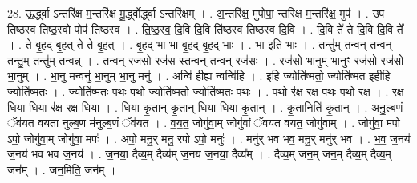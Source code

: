 \documentclass[17pt]{extarticle}
\begin{document}
28. ऊ॒र्द्ध्वा ऽन्तरि॑क्ष म॒न्तरि॑क्ष मू॒र्द्ध्वोर्द्ध्वा ऽन्तरि॑क्षम् । . अ॒न्तरि॑क्ष॒ मुपोपा॒ न्तरि॑क्ष म॒न्तरि॑क्ष॒ मुप॑ । . उप॑ तिष्ठस्व तिष्ठ॒स्वो पोप॑ तिष्ठस्व । . ति॒ष्ठ॒स्व॒ दि॒वि दि॒वि ति॑ष्ठस्व तिष्ठस्व दि॒वि । . दि॒वि ते॑ ते दि॒वि दि॒वि ते᳚ । . ते॒ बृ॒हद् बृ॒हत् ते॑ ते बृ॒हत् । . बृ॒हद् भा भा बृ॒हद् बृ॒हद् भाः । . भा इति॒ भाः । . तन्तु॑म् त॒न्वन् त॒न्वन् तन्तु॒म् तन्तु॑म् त॒न्वन्न् । . त॒न्वन् रज॑सो॒ रज॑स स्त॒न्वन् त॒न्वन् रज॑सः । . रज॑सो भा॒नुम् भा॒नुꣳ रज॑सो॒ रज॑सो भा॒नुम् । . भा॒नु मन्वनु॑ भा॒नुम् भा॒नु मनु॑ । . अन्वि॑ ही॒ह्य न्वन्वि॑हि । . इ॒हि॒ ज्योति॑ष्मतो॒ ज्योति॑ष्मत इहीहि॒ ज्योति॑ष्मतः । . ज्योति॑ष्मतः प॒थः प॒थो ज्योति॑ष्मतो॒ ज्योति॑ष्मतः प॒थः । . प॒थो र॑क्ष रक्ष प॒थः प॒थो र॑क्ष । . र॒क्ष॒ धि॒या धि॒या र॑क्ष रक्ष धि॒या । . धि॒या कृ॒तान् कृ॒तान् धि॒या धि॒या कृ॒तान् । . कृ॒तानिति॑ कृ॒तान् । . अ॒नु॒ल्ब॒णं ॅव॑यत वयता नुल्ब॒ण म॑नुल्ब॒णं ॅव॑यत । . व॒य॒त॒ जोगु॑वा॒म् जोगु॑वां ॅवयत वयत॒ जोगु॑वाम् । . जोगु॑वा॒ मपो ऽपो॒ जोगु॑वा॒म् जोगु॑वा॒ मपः॑ । . अपो॒ मनु॒र् मनु॒ रपो ऽपो॒ मनुः॑ । . मनु॑र् भव भव॒ मनु॒र् मनु॑र् भव । . भ॒व॒ ज॒नय॑ ज॒नय॑ भव भव ज॒नय॑ । . ज॒नया॒ दैव्य॒म् दैव्य॑म् ज॒नय॑ ज॒नया॒ दैव्य᳚म् । . दैव्य॒म् जन॒म् जन॒म् दैव्य॒म् दैव्य॒म् जन᳚म् । . जन॒मिति॒ जन᳚म् । \newline
\end{document}
